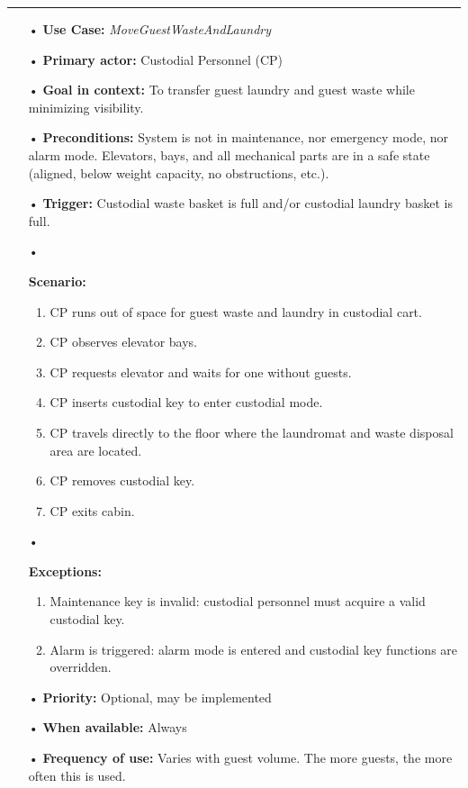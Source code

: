 \documentclass[12pt]{article}
\begin{document}
		\par\noindent\rule{\textwidth}{0.4pt}
		\begin{itemize} %
			\item[•] \textbf{Use Case:} \textit{MoveGuestWasteAndLaundry}
			\item[•] \textbf{Primary actor:} Custodial Personnel (CP) 
			\item[•] \textbf{Goal in context:} To transfer guest laundry and guest waste while minimizing visibility.
			\item[•] \textbf{Preconditions:} System is not in maintenance, nor emergency mode, nor alarm mode. 
			Elevators, bays, and all mechanical parts are in a safe state (aligned, below weight capacity, 
			no obstructions, etc.).
			\item[•] \textbf{Trigger:} Custodial waste basket is full and/or custodial laundry basket is full.
			\item[•]{\textbf{Scenario:}
		        \begin{enumerate}
		        	\item CP runs out of space for guest waste and laundry in custodial cart.
		        	\item CP observes elevator bays.
		        	\item CP requests elevator and waits for one without guests.
		        	\item CP inserts custodial key to enter custodial mode.
		        	\item CP travels directly to the floor where the laundromat and waste disposal area are located.
		        	\item CP removes custodial key.
		        	\item CP exits cabin.
		        \end{enumerate}}
			\item[•]{\textbf{Exceptions:} 
			    \begin{enumerate}
		        	\item Maintenance key is invalid: custodial personnel must acquire a valid custodial key.
			    	\item Alarm is triggered: alarm mode is entered and custodial key functions are overridden.
		        \end{enumerate}}
			\item[•] \textbf{Priority:} Optional, may be implemented
			\item[•] \textbf{When available:} Always
			\item[•] \textbf{Frequency of use:} Varies with guest volume. The more guests, the more often this is used.

\end{itemize}
\end{document}

